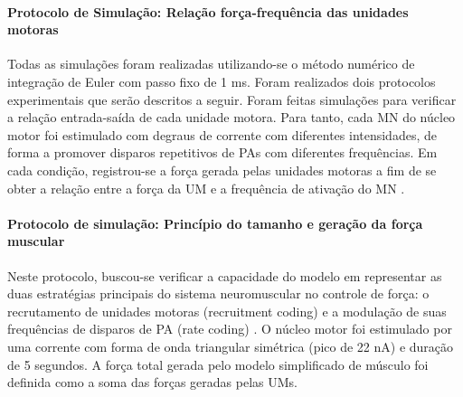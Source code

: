 \paragraph{Protocolo de Simulação: Relação força-frequência das unidades motoras}
Todas as simulações foram realizadas utilizando-se o método numérico de integração de Euler com passo fixo de 1 ms. Foram realizados dois protocolos experimentais que serão descritos a seguir. Foram feitas simulações para verificar a relação entrada-saída de cada unidade motora. Para tanto, cada MN do núcleo motor foi estimulado com degraus de corrente com diferentes intensidades, de forma a promover disparos repetitivos de PAs com diferentes frequências. Em cada condição, registrou-se a força gerada pelas unidades motoras a fim de se obter a relação entre a força da UM e a frequência de ativação do MN \cite{Kernell2006}.

\paragraph{Protocolo de simulação: Princípio do tamanho e geração da força muscular}
Neste protocolo, buscou-se verificar a capacidade do modelo em representar as duas estratégias principais do sistema neuromuscular no controle de força: o recrutamento de unidades motoras (recruitment coding) e a modulação de suas frequências de disparos de PA (rate coding) \cite{kandel2013}. O núcleo motor foi estimulado por uma corrente com forma de onda triangular simétrica (pico de 22 nA) e duração de 5 segundos. A força total gerada pelo modelo simplificado de músculo foi definida como a soma das forças geradas pelas UMs.